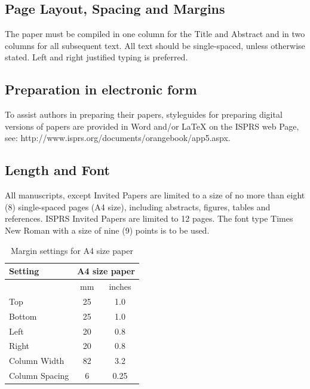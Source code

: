 \documentclass{isprs}
\begin{document}
\subsection{Page Layout, Spacing and Margins}\label{sec:Page Layout, Spacing and Margins}

The paper must be compiled in one column for the Title and Abstract and in two columns for all subsequent text. 
All text should be single-spaced, unless otherwise stated. Left and right justified typing is preferred.


\subsection{Preparation in electronic form}\label{sec:Preparation in electronic form}

To assist authors in preparing their papers, styleguides for preparing digital versions of papers are 
provided in Word and/or LaTeX on the ISPRS web Page, see: http://www.isprs.org/documents/orangebook/app5.aspx.



\subsection{Length and Font}\label{sec:Length and Font}

All manuscripts, except Invited Papers are limited to a size of no more than eight (8) single-spaced 
pages (A4 size), including abstracts, figures, tables and references. ISPRS Invited Papers are limited 
to 12 pages. The font type Times New Roman with a size of nine (9) points is to be used.

\begin{table}[h]
	\centering
		\begin{tabular}{|l|c|c|}\hline
			Setting&\multicolumn{2}{c|}{A4 size paper}\\\hline
			  &mm&inches\\
			 Top&25&1.0\\
			 Bottom&25&1.0\\
			 Left&20&0.8\\
			 Right&20&0.8\\
			 Column Width&82&3.2\\
			 Column Spacing&6&0.25\\\hline
		\end{tabular}
	\caption{Margin settings for A4 size paper}
\label{tab:Margin_settings}
\end{table}
\end{document}
